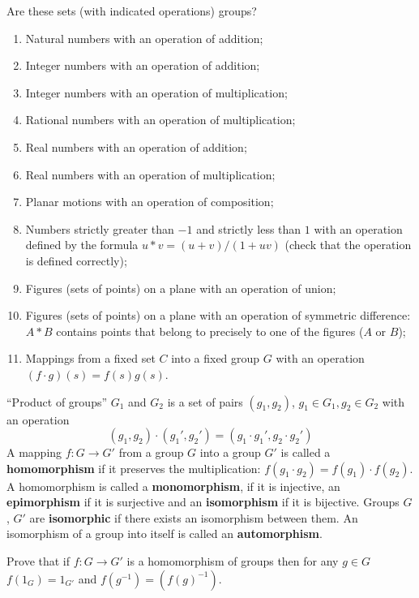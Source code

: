 \documentclass[12pt]{article}
\begin{document}
\begin{zadacha}\label{grp}
Are these sets (with indicated operations) groups?
\begin{enumerate}
\item Natural numbers with an operation of addition;
\item Integer numbers with an operation of addition;
\item Integer numbers with an operation of multiplication;
\item Rational numbers with an operation of multiplication;
\item Real numbers with an operation of addition;
\item Real numbers with an operation of multiplication;
\item\sttr Planar motions with an operation of composition;
\item Numbers strictly greater than $-1$ and strictly less than $1$ with
  an operation defined by the formula $u * v = (u+v)/(1+uv)$ (check
  that the operation is defined correctly);
\item Figures (sets of points) on a plane with an operation of union;
\item\sttr Figures (sets of points) on a plane with an operation of
  symmetric difference: $A * B$ contains points that belong to
  precisely to one of the figures ($A$ or $B$);
\item\sttr Mappings from a fixed set $C$ into a fixed group $G$ with
  an operation $(f \cdot g)(s) = f(s)g(s)$.
\end{enumerate}
\end{zadacha}

``Product of groups'' $G_1$ and $G_2$ is a set of pairs $(g_1,
g_2)$, $g_1\in G_1, g_2\in G_2$ with an operation
$$
(g_1, g_2) \cdot (g_1', g_2') =(g_1\cdot g_1', g_2\cdot g_2')
$$
A mapping $f:G \to G'$ from a group $G$ into a group $G'$ is called a
{\bf homomorphism} if it preserves the multiplication: $f(g_1 \cdot
g_2) = f(g_1) \cdot f(g_2)$. A homomorphism is called a {\bf
monomorphism}, if it is injective, an {\bf epimorphism} if it is
surjective and an {\bf isomorphism} if it is bijective. Groups $G$,
$G'$ are {\bf isomorphic} if there exists an isomorphism between
them. An isomorphism of a group into itself is called an {\bf
automorphism}.

\begin{zadacha} Prove that if $f:G \to G'$ is a homomorphism of groups
  then for any $g \in G$ $f(1_G) = 1_{G'}$ and
  $f(g^{-1})=(f(g)^{-1})$.
\end{zadacha}
\end{document}
